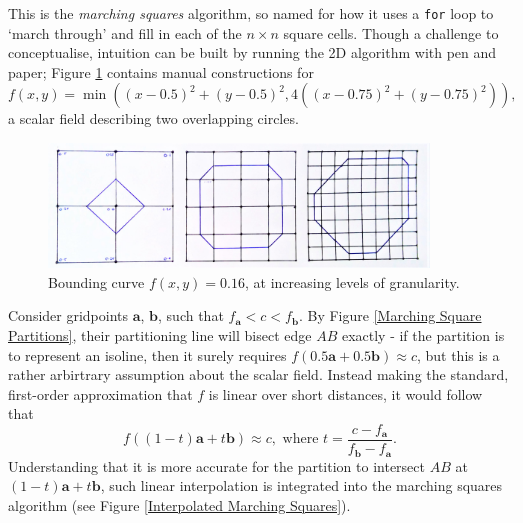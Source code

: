 \documentclass[a4paper, 11pt]{article}
\begin{document}
\begin{flushleft}
\vspace{5pt}\noindent
This is the \textit{marching squares} algorithm, so named for how it uses a \texttt{for} loop to `march through' and fill in each of the $n \times n$ square cells. Though a challenge to conceptualise, intuition can be built by running the 2D algorithm with pen and paper; Figure \ref{Marching Squares} contains manual constructions for %
$$f(x,y) = \min\left(\left(x-0.5\right)^2+\left(y-0.5\right)^2,4\left(\left(x-0.75\right)^2+\left(y-0.75\right)^2\right)\right),$$
a scalar field describing two overlapping circles.

\vspace{5pt}\noindent
\begin{figure}[h]
\centering
\includegraphics[width=0.9\textwidth]{Marching Squares}
\caption{Bounding curve $f(x,y) = 0.16$, at increasing levels of granularity.}
\label{Marching Squares}
\end{figure}

\vspace{5pt}\noindent
Consider gridpoints $\mathbf{a}$, $\mathbf{b}$, such that $f_{\mathbf{a}} < c < f_{\mathbf{b}}$. By Figure \ref{Marching Square Partitions}, their partitioning line will bisect edge $AB$ exactly - if the partition is to represent an isoline, then it surely requires $f\left(0.5\mathbf{a} + 0.5\mathbf{b}\right) \approx c$, but this is a rather arbirtrary assumption about the scalar field. Instead making the standard, first-order approximation that $f$ is linear over short distances, it would follow that
$$f\left((1-t)\mathbf{a} + t\mathbf{b}\right) \approx c, \,\, \textrm{where} \,\, t = \frac{c-f_{\mathbf{a}}}{f_{\mathbf{b}}-f_{\mathbf{a}}}.$$
Understanding that it is more accurate for the partition to intersect $AB$ at $(1-t)\mathbf{a} + t\mathbf{b}$, such linear interpolation is integrated into the marching squares algorithm (see Figure \ref{Interpolated Marching Squares}).


\end{flushleft}
\end{document}
